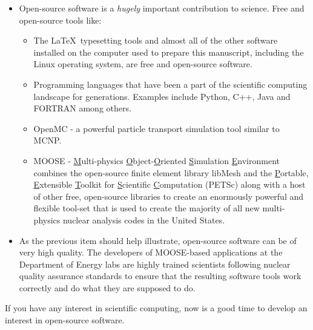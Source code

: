 \begin{itemize}
\item Open-source software is a \emph{hugely} important contribution to science.  Free and open-source tools like:
\begin{itemize}
\item The \LaTeX\ typesetting tools and almost all of the other software installed on the computer used to prepare this manuscript, including the Linux operating system, are free and open-source software.
\item Programming languages that have been a part of the scientific computing landscape for generations.  Examples include Python, C++, Java and FORTRAN among others.
\item OpenMC\cite{ROMANO201590} - a powerful particle transport simulation tool similar to MCNP.
\item MOOSE - \underline{M}ulti-physics \underline{O}bject-\underline{O}riented \underline{S}imulation \underline{E}nvironment\cite{lindsay2022moose} combines the open-source finite element library libMesh\cite{kirk2006libmesh} and the \underline{P}ortable, \underline{E}xtensible \underline{T}oolkit for \underline{S}cientific \underline{C}omputation (PETSc)\cite{petsc-user-ref} along with a host of other free, open-source libraries to create an enormously powerful and flexible tool-set that is used to create the majority of all new multi-physics nuclear analysis codes in the United States.
\end{itemize} 
\item As the previous item should help illustrate, open-source software can be of very high quality.  The developers of MOOSE-based applications at the Department of Energy labs are highly trained scientists following nuclear quality assurance standards to ensure that the resulting software tools work correctly and do what they are supposed to do. 

 

\end{itemize}
If you have any interest in scientific computing, now is a good time to develop an interest in open-source software.

